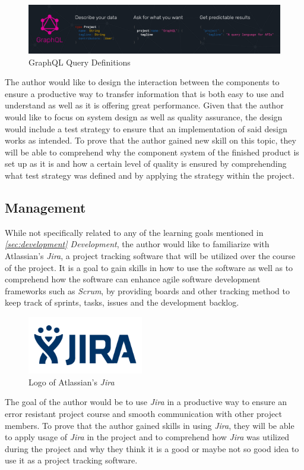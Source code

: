 \begin{figure}[!ht]
\includegraphics[width=\textwidth]{Pics/graphql.png}
\caption{GraphQL Query Definitions}
\label{fig:graphql}
\end{figure}

The author would like to design the interaction between the components to ensure a productive way to transfer information that is both easy to use and understand as well as it is offering great performance. Given that the author would like to focus on system design as well as quality assurance, the design would include a test strategy to ensure that an implementation of said design works as intended.
\newline
To prove that the author gained new skill on this topic, they will be able to comprehend why the component system of the finished product is set up as it is and how a certain level of quality is ensured by comprehending what test strategy was defined and by applying the strategy within the project.

\subsection{Management}

While not specifically related to any of the learning goals mentioned in \textit{\ref{sec:development} Development}, the author would like to familiarize with Atlassian's \textit{Jira}, a project tracking software that will be utilized over the course of the project. It is a goal to gain skills in how to use the software as well as to comprehend how the software can enhance agile software development frameworks such as \textit{Scrum}, by providing boards and other tracking method to keep track of sprints, tasks, issues and the development backlog.

\begin{figure}[!ht]
\begin{center}
\includegraphics[width=0.45\textwidth]{Pics/Jira.png}
\end{center}
\caption{Logo of Atlassian's \textit{Jira}}
\label{fig:jira}
\end{figure}

The goal of the author would be to use \textit{Jira} in a productive way to ensure an error resistant project course and smooth communication with other project members. To prove that the author gained skills in using \textit{Jira}, they will be able to apply usage of \textit{Jira} in the project and to comprehend how \textit{Jira} was utilized during the project and why they think it is a good or maybe not so good idea to use it as a project tracking software.